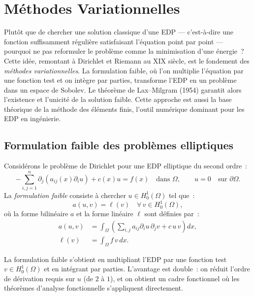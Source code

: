 \chapter{M\'ethodes Variationnelles}
\label{ch:variationnel}

Plut\^ot que de chercher une solution classique d'une EDP --- c'est-\`a-dire une fonction suffisamment r\'eguli\`ere satisfaisant l'\'equation point par point --- pourquoi ne pas reformuler le probl\`eme comme la minimisation d'une \'energie~? Cette id\'ee, remontant \`a Dirichlet et Riemann au XIX\ieme{} si\`ecle, est le fondement des \emph{m\'ethodes variationnelles}. La formulation faible, o\`u l'on multiplie l'\'equation par une fonction test et on int\`egre par parties, transforme l'EDP en un probl\`eme dans un espace de Sobolev. Le th\'eor\`eme de Lax--Milgram (1954) garantit alors l'existence et l'unicit\'e de la solution faible. Cette approche est aussi la base th\'eorique de la m\'ethode des \'el\'ements finis, l'outil num\'erique dominant pour les EDP en ing\'enierie.

\section{Formulation faible des probl\`emes elliptiques}

\begin{definition}
Consid\'erons le probl\`eme de Dirichlet pour une EDP elliptique du second ordre~:
\begin{equation}\label{eq:dirichlet}
    -\sum_{i,j=1}^n \partial_j(a_{ij}(x) \partial_i u) + c(x) u = f(x)
    \quad \text{dans } \Omega, \qquad u = 0 \quad \text{sur } \partial\Omega.
\end{equation}
La \emph{formulation faible} consiste \`a chercher $u \in H_0^1(\Omega)$ tel que~:
\[
    a(u, v) = \ell(v) \quad \forall\, v \in H_0^1(\Omega),
\]
o\`u la forme bilin\'eaire $a$ et la forme lin\'eaire $\ell$ sont d\'efinies par~:
\begin{align*}
    a(u, v) &= \int_\Omega \left( \sum_{i,j} a_{ij} \partial_i u \, \partial_j v
    + c\, u\, v \right) dx, \\
    \ell(v) &= \int_\Omega f\, v\, dx.
\end{align*}
\end{definition}

\begin{intuition}
La formulation faible s'obtient en multipliant l'EDP par une fonction test
$v \in H_0^1(\Omega)$ et en int\'egrant par parties. L'avantage est double~:
on r\'eduit l'ordre de d\'erivation requis sur $u$ (de $2$ \`a $1$), et on obtient
un cadre fonctionnel o\`u les th\'eor\`emes d'analyse fonctionnelle s'appliquent
directement.
\end{intuition}

